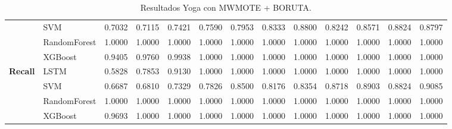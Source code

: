 \begin{table}[h]
\begin{adjustbox}{max width=15cm}
\begin{tabular}{|c|l|r|r|r|r|r|r|r|r|r|r|r|}
			& SVM &  0.7032 &  0.7115 &  0.7421 &  0.7590 &  0.7953 &  0.8333 &  0.8800 &  0.8242 &  0.8571 &  0.8824 &  0.8797 \\
			& RandomForest &  1.0000 &  1.0000 &  1.0000 &  1.0000 &  1.0000 &  1.0000 &  1.0000 &  1.0000 &  1.0000 &  1.0000 &  1.0000 \\
			& XGBoost &  0.9405 &  0.9760 &  0.9938 &  1.0000 &  1.0000 &  1.0000 &  1.0000 &  1.0000 &  1.0000 &  1.0000 &  1.0000 \\
			\hline
			\textbf{Recall} & LSTM &  0.5828 &  0.7853 &  0.9130 &  1.0000 &  1.0000 &  1.0000 &  1.0000 &  1.0000 &  1.0000 &  1.0000 &  1.0000 \\
			& SVM &  0.6687 &  0.6810 &  0.7329 &  0.7826 &  0.8500 &  0.8176 &  0.8354 &  0.8718 &  0.8903 &  0.8824 &  0.9085 \\
			& RandomForest &  1.0000 &  1.0000 &  1.0000 &  1.0000 &  1.0000 &  1.0000 &  1.0000 &  1.0000 &  1.0000 &  1.0000 &  1.0000 \\
			& XGBoost &  0.9693 &  1.0000 &  1.0000 &  1.0000 &  1.0000 &  1.0000 &  1.0000 &  1.0000 &  1.0000 &  1.0000 &  1.0000 \\
			\hline
		\end{tabular}
	\end{adjustbox}
	\caption{Resultados Yoga con MWMOTE + BORUTA.}
	\label{tab:Yoga_MWMOTE_BORUTA}
\end{table}

\newpage
